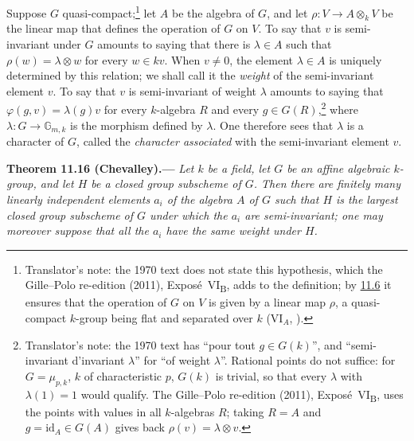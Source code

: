 Suppose \(G\) quasi-compact;\footnote{Translator's note: the 1970 text does not state this hypothesis, which the
Gille--Polo re-edition (2011), Expos\'e~VI\textsubscript{B}, adds to the definition; by
\hyperref[par:sga3-VIB-11.6]{11.6} it ensures that the operation of \(G\) on \(V\) is given by a linear map
\(\rho\), a quasi-compact \(k\)-group being flat and separated over \(k\) (VI\(_A\),
).} let \(A\) be the algebra of \(G\), and let
\(\rho:V\to A\otimes_kV\) be the linear map that defines the
operation of \(G\) on \(V\). To say that \(v\) is semi-invariant
under \(G\) amounts to saying that there is \(\lambda\in A\) such
that \(\rho(w)=\lambda\otimes w\) for every \(w\in kv\). When
\(v\neq0\), the element \(\lambda\in A\) is uniquely determined
by this relation; we shall call it the \emph{weight} of the
semi-invariant element \(v\). To say that \(v\) is semi-invariant
of weight \(\lambda\) amounts to saying that
\(\varphi(g,v)=\lambda(g)v\)
for every \(k\)-algebra \(R\) and every \(g\in G(R)\),\footnote{Translator's note: the 1970 text has ``pour tout
\(g\in G(k)\)'', and ``semi-invariant d'invariant \(\lambda\)'' for ``of weight \(\lambda\)''. Rational points do not
suffice: for \(G=\mu_{p,k}\), \(k\) of characteristic \(p\), \(G(k)\) is trivial, so that every \(\lambda\) with
\(\lambda(1)=1\) would qualify. The Gille--Polo re-edition (2011), Expos\'e~VI\textsubscript{B}, uses the points
with values in all \(k\)-algebras \(R\); taking \(R=A\) and \(g=\mathrm{id}_A\in G(A)\) gives back
\(\rho(v)=\lambda\otimes v\).} where \(\lambda:G\to\mathbb G_{m,k}\)
is the morphism defined by \(\lambda\). One therefore sees that
\(\lambda\) is a character of \(G\), called the
\emph{character associated} with the semi-invariant element
\(v\).

\medskip
{}\label{thm:sga3-VIB-11.16}%
\noindent\textbf{Theorem 11.16 \textup{(Chevalley)}.---}
\emph{Let \(k\) be a field, let \(G\) be an affine algebraic
\(k\)-group, and let \(H\) be a closed group subscheme of \(G\).
Then there are finitely many linearly independent elements
\(a_i\) of the algebra \(A\) of \(G\) such that \(H\) is the
largest closed group subscheme of \(G\) under which the \(a_i\)
are semi-invariant; one may moreover suppose that all the
\(a_i\) have the same weight under \(H\).}

